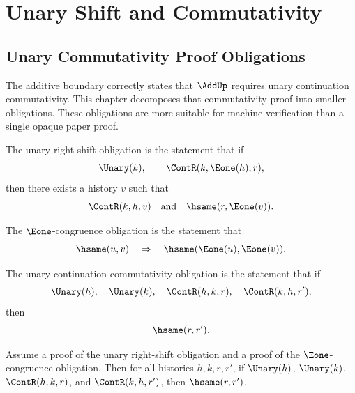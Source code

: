 \chapter{Unary Shift and Commutativity}
\label{ch:proof-obligations-unary-shift-and-commutativity}

\section{Unary Commutativity Proof Obligations}
\label{sec:po-unary-obligations-abstract}

The additive boundary correctly states that \(\AddUp\) requires unary continuation commutativity. This chapter decomposes that commutativity proof into smaller obligations. These obligations are more suitable for machine verification than a single opaque paper proof.

\begin{definition}
\label{def:unary-right-shift-obligation}
The unary right-shift obligation is the statement that if
$$
  \Unary(k),
  \qquad
  \ContR(k,\Eone(h),r),
$$
then there exists a history \(v\) such that
$$
  \ContR(k,h,v)
  \quad\text{and}\quad
  \hsame(r,\Eone(v)).
$$
\end{definition}

\begin{definition}
\label{def:eone-congruence-obligation}
The \(\Eone\)-congruence obligation is the statement that
$$
  \hsame(u,v)
  \quad\Rightarrow\quad
  \hsame(\Eone(u),\Eone(v)).
$$
\end{definition}

\begin{definition}
The unary continuation commutativity obligation is the statement that if
$$
  \Unary(h),\quad \Unary(k),\quad
  \ContR(h,k,r),\quad \ContR(k,h,r'),
$$
then
$$
  \hsame(r,r').
$$
\end{definition}

\begin{theorem}
\label{thm:comm-from-obligations}
Assume a proof of the unary right-shift obligation and a proof of the
$\Eone$-congruence obligation. Then for all histories $h,k,r,r'$, if
$\Unary(h)$, $\Unary(k)$, $\ContR(h,k,r)$, and $\ContR(k,h,r')$, then
$\hsame(r,r')$.
\end{theorem}

